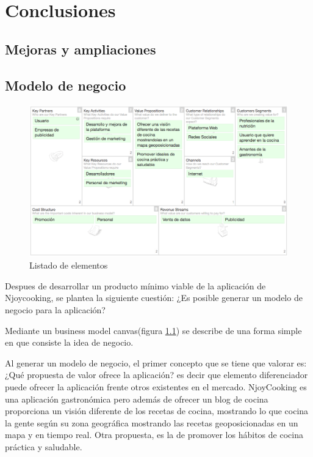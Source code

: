 \chapter{Conclusiones}

\section{Mejoras y ampliaciones}


\section{Modelo de negocio}

\begin{figure}
\begin{center}
\includegraphics[width=1.0\textwidth]{imagenes/business-canvas.png}
\caption{Listado de elementos}
\label{business-canvas}
\end{center}
\end{figure}

Despues de desarrollar un producto mínimo viable de la aplicación de Njoycooking, se plantea la siguiente cuestión: ¿Es posible generar un modelo de negocio para la aplicación?

Mediante un business model canvas(figura \ref{business-canvas}) se describe de una forma simple en que consiste la idea de negocio.

\vspace{5 mm}

Al generar un modelo de negocio, el primer concepto que se tiene que valorar es: ¿Qué propuesta de valor ofrece la aplicación? es decir que elemento diferenciador puede ofrecer la aplicación frente otros existentes en el mercado. NjoyCooking es una aplicación gastronómica pero además de ofrecer un blog de cocina proporciona un visión diferente de los recetas de cocina, mostrando lo que cocina la gente según su zona geográfica mostrando las recetas geoposicionadas en un mapa y en tiempo real. Otra propuesta, es la de promover los hábitos de cocina práctica y saludable. 


